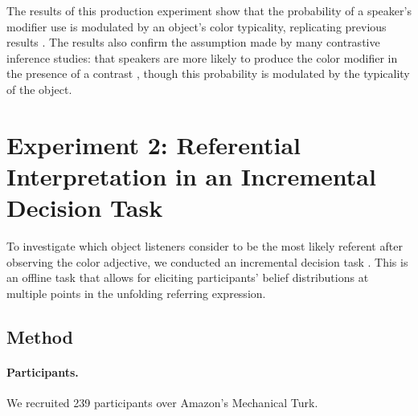 \documentclass[10pt,letterpaper]{article}
\begin{document}
The results of this production experiment show that the probability of a speaker's modifier use is modulated by an object's color typicality, replicating previous results \cite{Westerbeek:2015}. The results also confirm the assumption made by many contrastive inference studies: that speakers are more likely to produce the color modifier in the presence of a contrast \cite{Aparicio:2018,Grodner:2011,Sedivy:1999}, though this probability is modulated by the typicality of the object.


\section{Experiment 2: Referential Interpretation in an Incremental Decision Task}

To investigate which object listeners consider to be the most likely referent after observing the color adjective, we conducted an incremental decision task \cite{Qing:2018}. This is an offline task that allows for eliciting participants' belief distributions at multiple points in the unfolding referring expression. 

\subsection{Method}
\paragraph{Participants.} We recruited 239 participants over Amazon's Mechanical Turk.
\end{document}
